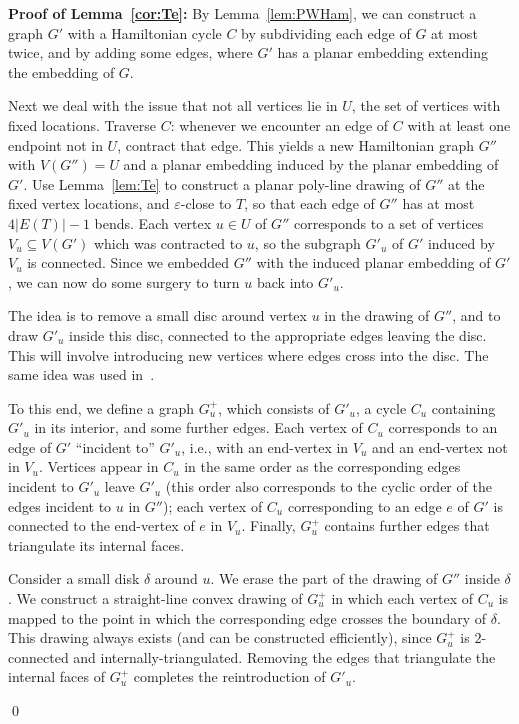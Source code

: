 \documentclass{llncs}
\newenvironment{proofof}[1]{\par\addvspace\topsep\noindent
{\bf Proof #1:} \ignorespaces }{\qed}
\begin{document}
\begin{proofof}{of Lemma~\ref{cor:Te}}
By Lemma~\ref{lem:PWHam}, we can construct a graph $G'$ with a Hamiltonian cycle $C$ by subdividing each edge of $G$ at most twice, and by adding some edges, where $G'$ has a planar embedding extending the embedding of $G$.

Next we deal with the issue that not all vertices lie in $U$, the set of vertices with fixed locations.  Traverse $C$: whenever we encounter an edge of $C$ with at least one endpoint not in $U$, contract that edge. This yields a new Hamiltonian graph $G''$ with $V(G'') = U$ and a planar embedding induced by the planar embedding of $G'$. Use Lemma~\ref{lem:Te} to construct a planar poly-line drawing of  $G''$ at the fixed vertex locations, and $\varepsilon$-close to $T$, so that each edge of $G''$ has at most $4|E(T)|-1$ bends. Each vertex $u \in U$ of $G''$ corresponds to a set of vertices $V_u \subseteq V(G')$ which was contracted to $u$, so the subgraph $G'_u$ of $G'$ induced by $V_u$ is connected. Since we embedded $G''$ with the induced planar embedding of $G'$, we can now do some surgery to turn $u$ back into $G'_u$.

The idea is to remove a small disc around vertex $u$ in the drawing of $G''$, and to draw $G'_u$ inside this disc, connected to the appropriate edges leaving the disc.
This will involve introducing new vertices where edges cross into the disc.
The same idea was used in~\cite[Theorem 2]{HJL}.

To this end, we define a graph $G^+_u$, which consists of $G'_u$, a cycle $C_u$ containing $G'_u$ in its interior, and some further edges. Each vertex of $C_u$ corresponds to an edge of $G'$ ``incident to'' $G'_u$, i.e., with an end-vertex in $V_u$ and an end-vertex not in $V_u$.
Vertices appear in $C_u$ in the same order as the corresponding edges incident to $G'_u$ leave $G'_u$ (this order also corresponds to the cyclic order of the edges incident to $u$ in $G''$); each vertex of $C_u$ corresponding to an edge $e$ of $G'$ is connected to the end-vertex of $e$ in $V_u$. Finally, $G^+_u$ contains further edges that triangulate its internal faces.

Consider a small disk $\delta$ around $u$. We erase the part of the drawing of $G''$ inside $\delta$. We construct a straight-line convex drawing of $G^+_u$ in which each vertex of $C_u$ is mapped to the point in which the corresponding edge crosses the boundary of $\delta$. This drawing always exists (and can be constructed efficiently), since $G^+_u$ is $2$-connected and internally-triangulated. Removing the edges that triangulate the internal faces of $G^+_u$ completes the reintroduction of $G'_u$.


\end{proofof}
\end{document}
